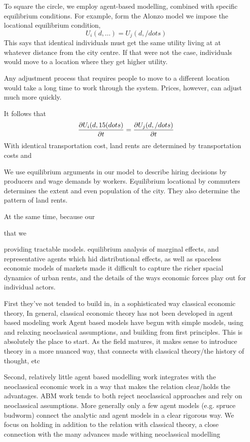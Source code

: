 To square the circle, we employ  agent-based modelling, combined with specific equilibrium conditions. For example, form the Alonzo model we impose the locational equilibrium condition,
\[U_i(d,\dots)=U_j(d, /dots)\]
This says that identical individuals must get the same utility living at at whatever distance from the city centre. If that were not the case, individuals would move to a location where they get higher utility.

Any adjustment process that requires people to move to a different location would take a long time to work through the system. Prices, however, can adjust much more quickly. 

 It follows that 
\[\frac{\partial U_i(d,15(dots)}{\partial t}=\frac{\partial U_j(d, /dots)}{\partial t}\]
With identical transportation cost, 
land rents are determined by transportation costs  and  

We use  equilibrium arguments in our model to describe hiring decisions by producers and wage demands by workers. Equilibrium locational by commuters determines the extent and even population of the city. They also determine the pattern of land rents. 

At the same time, because our  

that we 

providing tractable models.  equilibrium analysis of marginal effects, and representative agents which hid distributional effects, as well as spaceless economic models of markets made it difficult to capture the richer spacial dynamics of urban rents, and the details of the ways economic forces play out for individual actors.

First they've not tended to build in, in a sophisticated way classical economic theory,
In general, classical economic theory has not been developed in agent based modeling work
Agent based models have begun with simple models, using and relaxing neoclassical assumptions, and building from first principles. This is absolutely the place to start. As the field matures, it makes sense to introduce theory in a more nuanced way, that connects with classical theory/the history of thought, etc

Second, relatively little agent based modelling work integrates with the neoclassical economic work in a way that makes the relation clear/holds the advantages. ABM work tends to both reject neoclassical approaches and rely on neoclassical assumptions.
More generally only a few agent models (e.g. spruce budworm) connect the analytic and agent models in a clear rigorous way. We focus on holding in addition to the relation with classical theory, a close connection with the many advances made withing neoclassical modelling

